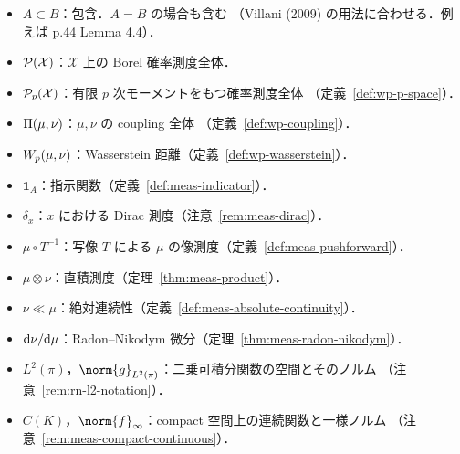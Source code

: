 \begin{itemize}
  \item $A\subset B$：包含．$A=B$ の場合も含む
    （Villani (2009) の用法に合わせる．例えば p.44 Lemma 4.4）．
  \item $\mathcal{P}(\mathcal{X})$：$\mathcal{X}$ 上の Borel 確率測度全体．
  \item $\mathcal{P}_{p}(\mathcal{X})$：有限 $p$ 次モーメントをもつ確率測度全体
    （定義~\ref{def:wp-p-space}）．
  \item $\Pi(\mu,\nu)$：$\mu,\nu$ の coupling 全体
    （定義~\ref{def:wp-coupling}）．
  \item $W_p(\mu,\nu)$：Wasserstein 距離（定義~\ref{def:wp-wasserstein}）．
  \item $\mathbf{1}_A$：指示関数（定義~\ref{def:meas-indicator}）．
  \item $\delta_x$：$x$ における Dirac 測度（注意~\ref{rem:meas-dirac}）．
  \item $\mu\circ T^{-1}$：写像 $T$ による $\mu$ の像測度（定義~\ref{def:meas-pushforward}）．
  \item $\mu\otimes\nu$：直積測度（定理~\ref{thm:meas-product}）．
  \item $\nu\ll\mu$：絶対連続性（定義~\ref{def:meas-absolute-continuity}）．
  \item $\mathrm{d}\nu/\mathrm{d}\mu$：Radon--Nikodym 微分（定理~\ref{thm:meas-radon-nikodym}）．
  \item $L^2(\pi)$，$\norm{g}_{L^2(\pi)}$：二乗可積分関数の空間とそのノルム
    （注意~\ref{rem:rn-l2-notation}）．
  \item $C(K)$，$\norm{f}_\infty$：compact 空間上の連続関数と一様ノルム
    （注意~\ref{rem:meas-compact-continuous}）．
\end{itemize}
